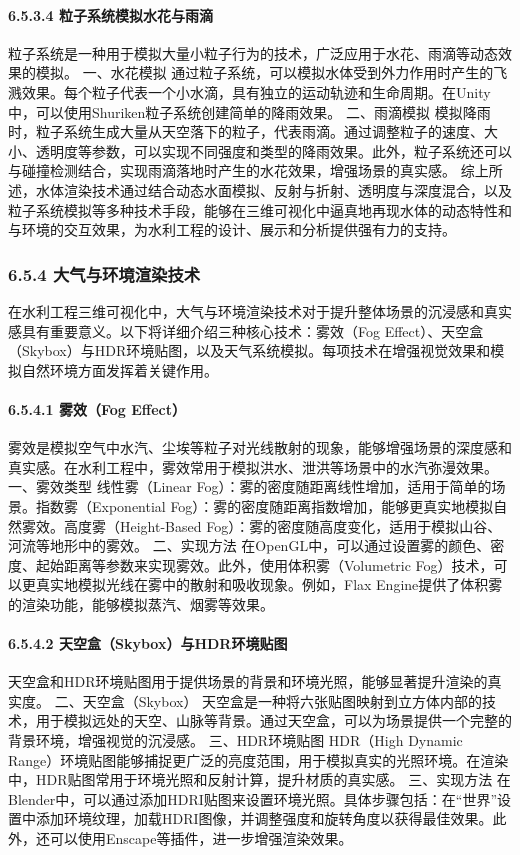 {{{{{{{{{{\paragraph{6.5.3.4 粒子系统模拟水花与雨滴}\label{ux7c92ux5b50ux7cfbux7edfux6a21ux62dfux6c34ux82b1ux4e0eux96e8ux6ef4}
粒子系统是一种用于模拟大量小粒子行为的技术，广泛应用于水花、雨滴等动态效果的模拟。 一、水花模拟
通过粒子系统，可以模拟水体受到外力作用时产生的飞溅效果。每个粒子代表一个小水滴，具有独立的运动轨迹和生命周期。在Unity中，可以使用Shuriken粒子系统创建简单的降雨效果。 二、雨滴模拟
模拟降雨时，粒子系统生成大量从天空落下的粒子，代表雨滴。通过调整粒子的速度、大小、透明度等参数，可以实现不同强度和类型的降雨效果。此外，粒子系统还可以与碰撞检测结合，实现雨滴落地时产生的水花效果，增强场景的真实感。
综上所述，水体渲染技术通过结合动态水面模拟、反射与折射、透明度与深度混合，以及粒子系统模拟等多种技术手段，能够在三维可视化中逼真地再现水体的动态特性和与环境的交互效果，为水利工程的设计、展示和分析提供强有力的支持。
\subsubsection{6.5.4 大气与环境渲染技术}\label{ux5927ux6c14ux4e0eux73afux5883ux6e32ux67d3ux6280ux672f}
在水利工程三维可视化中，大气与环境渲染技术对于提升整体场景的沉浸感和真实感具有重要意义。以下将详细介绍三种核心技术：雾效（Fog
Effect）、天空盒（Skybox）与HDR环境贴图，以及天气系统模拟。每项技术在增强视觉效果和模拟自然环境方面发挥着关键作用。 \paragraph{6.5.4.1 雾效（Fog
Effect）}\label{ux96feux6548fog-effect} 雾效是模拟空气中水汽、尘埃等粒子对光线散射的现象，能够增强场景的深度感和真实感。在水利工程中，雾效常用于模拟洪水、泄洪等场景中的水汽弥漫效果。 一、雾效类型
线性雾（Linear Fog）：雾的密度随距离线性增加，适用于简单的场景。指数雾（Exponential Fog）：雾的密度随距离指数增加，能够更真实地模拟自然雾效。高度雾（Height-Based
Fog）：雾的密度随高度变化，适用于模拟山谷、河流等地形中的雾效。 二、实现方法 在OpenGL中，可以通过设置雾的颜色、密度、起始距离等参数来实现雾效。此外，使用体积雾（Volumetric
Fog）技术，可以更真实地模拟光线在雾中的散射和吸收现象。例如，Flax Engine提供了体积雾的渲染功能，能够模拟蒸汽、烟雾等效果。 \paragraph{6.5.4.2
天空盒（Skybox）与HDR环境贴图}\label{ux5929ux7a7aux76d2skyboxux4e0ehdrux73afux5883ux8d34ux56fe}
天空盒和HDR环境贴图用于提供场景的背景和环境光照，能够显著提升渲染的真实度。 二、天空盒（Skybox）
天空盒是一种将六张贴图映射到立方体内部的技术，用于模拟远处的天空、山脉等背景。通过天空盒，可以为场景提供一个完整的背景环境，增强视觉的沉浸感。 三、HDR环境贴图 HDR（High Dynamic
Range）环境贴图能够捕捉更广泛的亮度范围，用于模拟真实的光照环境。在渲染中，HDR贴图常用于环境光照和反射计算，提升材质的真实感。 三、实现方法
在Blender中，可以通过添加HDRI贴图来设置环境光照。具体步骤包括：在``世界''设置中添加环境纹理，加载HDRI图像，并调整强度和旋转角度以获得最佳效果。此外，还可以使用Enscape等插件，进一步增强渲染效果。
}}}}}}}}}}
